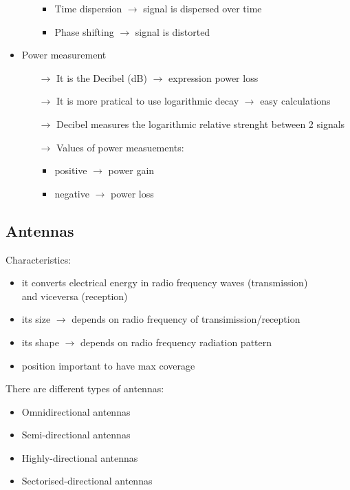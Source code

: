 \begin{itemize}
\begin{itemize}
\begin{itemize}
            \item Time dispersion $\rightarrow$ signal is dispersed over time
            \item Phase shifting $\rightarrow$ signal is distorted
        \end{itemize}
    \end{itemize}
    \item Power measurement
    \begin{itemize}
        \item[$\rightarrow$] It is the Decibel (dB) $\rightarrow$ expression
        power loss
        \item[$\rightarrow$] It is more pratical to use logarithmic decay
        $\rightarrow$ easy calculations
        \item[$\rightarrow$] Decibel measures the logarithmic relative strenght
        between 2 signals
        \item[$\rightarrow$] Values of power measuements:
        \begin{itemize}
            \item positive $\rightarrow$ power gain
            \item negative $\rightarrow$ power loss
        \end{itemize}
    \end{itemize}
\end{itemize}

\subsection{Antennas}

Characteristics:
\vspace{-0.1cm}\begin{itemize}
    \item it converts electrical energy in radio
    frequency waves (transmission)\\and viceversa (reception)
    \item its size $\rightarrow$ depends on radio
    frequency of transimission/reception
    \item its shape $\rightarrow$ depends on radio
    frequency radiation pattern
    \item position important to have max coverage
\end{itemize}

There are different types of antennas:
\begin{itemize}
    \item Omnidirectional antennas
    \item Semi-directional antennas
    \item Highly-directional antennas
    \item Sectorised-directional antennas
\end{itemize} 
